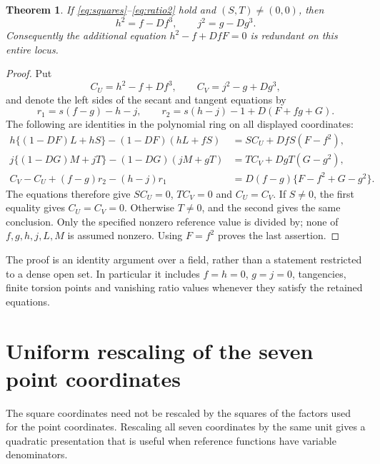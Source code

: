 \documentclass[11pt,a4paper]{article}
\newtheorem{theorem}{Theorem}[section]
\theoremstyle{remark}\newtheorem{remark}[theorem]{Remark}
\begin{document}
\begin{theorem}\label{thm:implication}
If \eqref{eq:squares}--\eqref{eq:ratio2} hold and $(S,T)\ne(0,0)$,
then
\[
                  h^2=f-Df^3,\qquad j^2=g-Dg^3.
\]
Consequently the additional equation $h^2-f+DfF=0$ is redundant on
this entire locus.
\end{theorem}
\begin{proof}
Put
\[
 C_U=h^2-f+Df^3,\qquad C_V=j^2-g+Dg^3,
\]
and denote the left sides of the secant and tangent equations by
\[
 r_1=s(f-g)-h-j,\qquad r_2=s(h-j)-1+D(F+fg+G).
\]
The following are identities in the polynomial ring on all displayed
coordinates:
\begin{align}
 h\{(1-DF)L+hS\}-(1-DF)(hL+fS)
 &=SC_U+DfS(F-f^2),\label{eq:id1}\\
 j\{(1-DG)M+jT\}-(1-DG)(jM+gT)
 &=TC_V+DgT(G-g^2),\label{eq:id2}\\
 C_V-C_U+(f-g)r_2-(h-j)r_1
 &=D(f-g)\{F-f^2+G-g^2\}.\label{eq:id3}
\end{align}
The equations therefore give $SC_U=0$, $TC_V=0$ and $C_U=C_V$.
If $S\ne0$, the first equality gives $C_U=C_V=0$. Otherwise $T\ne0$,
and the second gives the same conclusion. Only the specified nonzero
reference value is divided by; none of $f,g,h,j,L,M$ is assumed nonzero.
Using $F=f^2$ proves the last assertion.
\end{proof}

The proof is an identity argument over a field, rather than a statement
restricted to a dense open set. In particular it includes $f=h=0$,
$g=j=0$, tangencies, finite torsion points and vanishing ratio values
whenever they satisfy the retained equations.

\section{Uniform rescaling of the seven point coordinates}
The square coordinates need not be rescaled by the squares of the
factors used for the point coordinates. Rescaling all seven coordinates
by the same unit gives a quadratic presentation that is useful when
reference functions have variable denominators.
\end{document}
